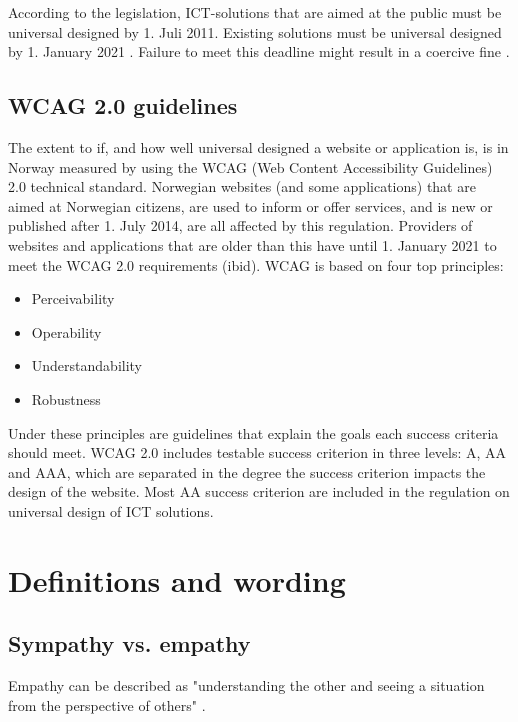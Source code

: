 According to the legislation, ICT-solutions that are aimed at the public must be universal designed by 1. Juli 2011. Existing solutions must be universal designed by 1. January 2021 \parencite{_lov_2013}. Failure to meet this deadline might result in a coercive fine \parencite{_lov_2013}.

\subsection{WCAG 2.0 guidelines}
The extent to if, and how well universal designed a website or application is, is in Norway measured by using the \Gls{WCAG} (Web Content Accessibility Guidelines) 2.0 technical standard. Norwegian websites (and some applications) that are aimed at Norwegian citizens, are used to inform or offer services, and is new or published after 1. July 2014, are all affected by this regulation. Providers of websites and applications that are older than this have until 1. January 2021 to meet the WCAG 2.0 requirements (ibid).
\Gls{WCAG} is based on four top principles:
\begin{itemize}
    \item Perceivability
    \item Operability
    \item Understandability
    \item Robustness
\end{itemize}

Under these principles are guidelines that explain the goals each success criteria should meet. WCAG 2.0 includes testable success criterion in three levels: A, AA and AAA, which are separated in the degree the success criterion impacts the design of the website. Most AA success criterion are included in the regulation on universal design of ICT solutions. %


\section{Definitions and wording}
\subsection{Sympathy vs. empathy}
Empathy can be described as "understanding the other and seeing a situation from the perspective of others" \parencite{lundstrom_perceptions_2015}.  




